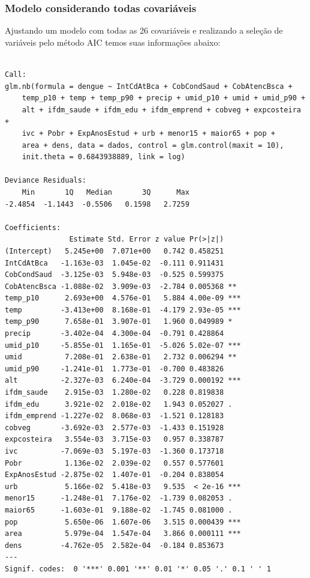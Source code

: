 \documentclass[12pt,a4paper]{article}\usepackage[]{graphicx}\usepackage[]{color}
\makeatletter
\newenvironment{kframe}{%
 \def\at@end@of@kframe{}%
 \ifinner\ifhmode%
  \def\at@end@of@kframe{\end{minipage}}%
  \begin{minipage}{\columnwidth}%
 \fi\fi%
 \def\FrameCommand##1{\hskip\@totalleftmargin \hskip-\fboxsep
 \colorbox{shadecolor}{##1}\hskip-\fboxsep
     \hskip-\linewidth \hskip-\@totalleftmargin \hskip\columnwidth}%
 \MakeFramed {\advance\hsize-\width
   \@totalleftmargin\z@ \linewidth\hsize
   \@setminipage}}%
 {\par\unskip\endMakeFramed%
 \at@end@of@kframe}
\newenvironment{knitrout}{}{} %
\makeatother
\begin{document}
\subsubsection{\textbf{Modelo considerando todas covariáveis}}
Ajustando um modelo com todas as 26 covariáveis e realizando a seleção de variáveis pelo método AIC temos suas informações abaixo:
\begin{knitrout}
\color{fgcolor}\begin{kframe}
\begin{verbatim}

Call:
glm.nb(formula = dengue ~ IntCdAtBca + CobCondSaud + CobAtencBsca + 
    temp_p10 + temp + temp_p90 + precip + umid_p10 + umid + umid_p90 + 
    alt + ifdm_saude + ifdm_edu + ifdm_emprend + cobveg + expcosteira + 
    ivc + Pobr + ExpAnosEstud + urb + menor15 + maior65 + pop + 
    area + dens, data = dados, control = glm.control(maxit = 10), 
    init.theta = 0.6843938889, link = log)

Deviance Residuals: 
    Min       1Q   Median       3Q      Max  
-2.4854  -1.1443  -0.5506   0.1598   2.7259  

Coefficients:
               Estimate Std. Error z value Pr(>|z|)    
(Intercept)   5.245e+00  7.071e+00   0.742 0.458251    
IntCdAtBca   -1.163e-03  1.045e-02  -0.111 0.911431    
CobCondSaud  -3.125e-03  5.948e-03  -0.525 0.599375    
CobAtencBsca -1.088e-02  3.909e-03  -2.784 0.005368 ** 
temp_p10      2.693e+00  4.576e-01   5.884 4.00e-09 ***
temp         -3.413e+00  8.168e-01  -4.179 2.93e-05 ***
temp_p90      7.658e-01  3.907e-01   1.960 0.049989 *  
precip       -3.402e-04  4.300e-04  -0.791 0.428864    
umid_p10     -5.855e-01  1.165e-01  -5.026 5.02e-07 ***
umid          7.208e-01  2.638e-01   2.732 0.006294 ** 
umid_p90     -1.241e-01  1.773e-01  -0.700 0.483826    
alt          -2.327e-03  6.240e-04  -3.729 0.000192 ***
ifdm_saude    2.915e-03  1.280e-02   0.228 0.819838    
ifdm_edu      3.921e-02  2.018e-02   1.943 0.052027 .  
ifdm_emprend -1.227e-02  8.068e-03  -1.521 0.128183    
cobveg       -3.692e-03  2.577e-03  -1.433 0.151928    
expcosteira   3.554e-03  3.715e-03   0.957 0.338787    
ivc          -7.069e-03  5.197e-03  -1.360 0.173718    
Pobr          1.136e-02  2.039e-02   0.557 0.577601    
ExpAnosEstud -2.875e-02  1.407e-01  -0.204 0.838054    
urb           5.166e-02  5.418e-03   9.535  < 2e-16 ***
menor15      -1.248e-01  7.176e-02  -1.739 0.082053 .  
maior65      -1.603e-01  9.188e-02  -1.745 0.081000 .  
pop           5.650e-06  1.607e-06   3.515 0.000439 ***
area          5.979e-04  1.547e-04   3.866 0.000111 ***
dens         -4.762e-05  2.582e-04  -0.184 0.853673    
---
Signif. codes:  0 '***' 0.001 '**' 0.01 '*' 0.05 '.' 0.1 ' ' 1


\end{verbatim}
\end{kframe}
\end{knitrout}
\end{document}
